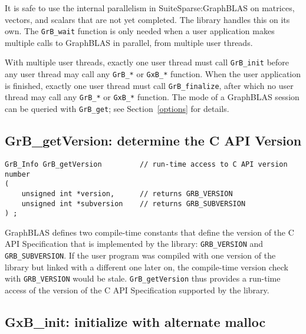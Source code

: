 \documentclass[12pt]{article}
\begin{document}
It is safe to use the internal parallelism in SuiteSparse:GraphBLAS on
matrices, vectors, and scalars that are not yet completed.  The library
handles this on its own.  The \verb'GrB_wait' function is only
needed when a user application makes multiple calls to GraphBLAS in parallel,
from multiple user threads.

With multiple user threads, exactly one user thread must call \verb'GrB_init'
before any user thread may call any \verb'GrB_*' or \verb'GxB_*' function.
When the user application is finished, exactly one user thread must call
\verb'GrB_finalize', after which no user thread may call any \verb'GrB_*' or
\verb'GxB_*' function.
The mode of a GraphBLAS session can be queried with \verb'GrB_get';
see Section~\ref{options} for details.

\subsection{{\sf GrB\_getVersion:} determine the C API Version} %
\label{getVersion}

\begin{mdframed}[userdefinedwidth=6in]
{\footnotesize
\begin{verbatim}
GrB_Info GrB_getVersion         // run-time access to C API version number
(
    unsigned int *version,      // returns GRB_VERSION
    unsigned int *subversion    // returns GRB_SUBVERSION
) ;
\end{verbatim}
}\end{mdframed}

GraphBLAS defines two compile-time constants that
define the version of the C API Specification
that is implemented by the library:
\verb'GRB_VERSION' and \verb'GRB_SUBVERSION'.
If the user program was compiled with one
version of the library but linked with a different one later on, the
compile-time version check with \verb'GRB_VERSION' would be stale.
\verb'GrB_getVersion' thus provides a run-time access of the version of the C
API Specification supported by the library.

\subsection{{\sf GxB\_init:} initialize with alternate malloc} %
\label{xinit}
\end{document}
